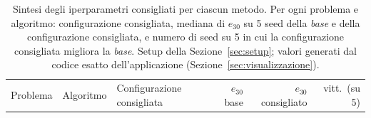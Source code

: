 \begin{table}[H]
\centering
\footnotesize
\renewcommand{\arraystretch}{1.1}
\setlength{\tabcolsep}{4pt}
\caption{Sintesi degli iperparametri consigliati per ciascun metodo. Per ogni problema e algoritmo: configurazione consigliata, mediana di $e_{30}$ su 5 seed della \emph{base} e della configurazione consigliata, e numero di seed su 5 in cui la configurazione consigliata migliora la \emph{base}. Setup della Sezione~\ref{sec:setup}; valori generati dal codice esatto dell'applicazione (Sezione~\ref{sec:visualizzazione}).}
\label{tab:riuso_cons_sintesi}
\begin{tabular}{@{}llp{3.4cm}rrr@{}}
\toprule
Problema & Algoritmo & Configurazione consigliata & $e_{30}$ base & $e_{30}$ consigliato & vitt.\ (su 5)\\


\end{tabular}
\end{table}
